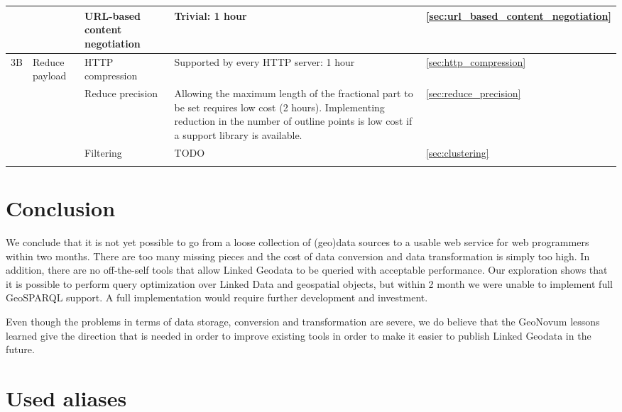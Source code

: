\documentclass[a4paper]{scrartcl}
\begin{document}
\begin{landscape}
\begin{longtable}{|p{1.25cm}|p{3.25cm}|p{3.25cm}|p{8cm}|p{1.25cm}|}
    & & URL-based content negotiation & Trivial: 1 hour &
    \ref{sec:url_based_content_negotiation}\\
    
    \hline

    3B & Reduce payload & HTTP compression & Supported by every HTTP
    server: 1 hour & \ref{sec:http_compression}\\

    \hline

    & & Reduce precision & Allowing the maximum length of the
    fractional part to be set requires low cost (2 hours).
    Implementing reduction in the number of outline points is low cost
    if a support library is available. & \ref{sec:reduce_precision}\\

    \hline

    & & Filtering & TODO & \ref{sec:clustering}\\
    
    \hline
    \label{tab:quantifying}
  \end{longtable}
\end{landscape}


\section{Conclusion}

We conclude that it is not yet possible to go from a loose collection
of (geo)data sources to a usable web service for web programmers
within two months.  There are too many missing pieces and the cost of
data conversion and data transformation is simply too high.  In
addition, there are no off-the-self tools that allow Linked Geodata to
be queried with acceptable performance.  Our exploration shows that it
is possible to perform query optimization over Linked Data and
geospatial objects, but within 2 month we were unable to implement
full GeoSPARQL support.  A full implementation would require further
development and investment.

Even though the problems in terms of data storage, conversion and
transformation are severe, we do believe that the GeoNovum lessons
learned give the direction that is needed in order to improve existing
tools in order to make it easier to publish Linked Geodata in the
future.






\appendix

\section{Used aliases}
\end{document}
